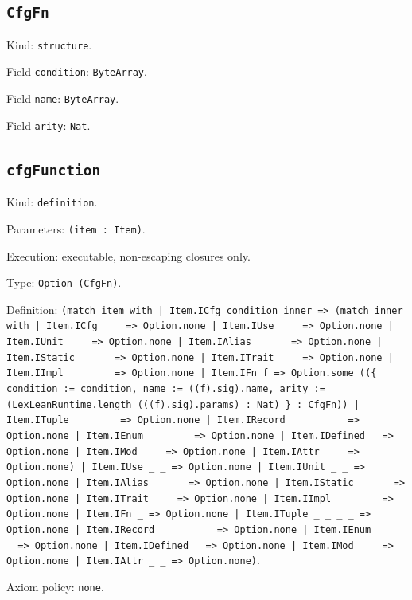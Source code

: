 \documentclass[11pt]{article}
\begin{document}
\subsection*{\texttt{CfgFn}}
\noindent Kind: \texttt{structure}.\par
\noindent Field \texttt{condition}: \texttt{ByteArray}.\par
\noindent Field \texttt{name}: \texttt{ByteArray}.\par
\noindent Field \texttt{arity}: \texttt{Nat}.\par
\subsection*{\texttt{cfgFunction}}
\noindent Kind: \texttt{definition}.\par
\noindent Parameters: \texttt{(item : Item)}.\par
\noindent Execution: executable, non-escaping closures only.\par
\noindent Type: \texttt{Option (CfgFn)}.\par
\noindent Definition: \texttt{(match item with | Item.ICfg condition inner => (match inner with | Item.ICfg \_ \_ => Option.none | Item.IUse \_ \_ => Option.none | Item.IUnit \_ \_ => Option.none | Item.IAlias \_ \_ \_ => Option.none | Item.IStatic \_ \_ \_ => Option.none | Item.ITrait \_ \_ => Option.none | Item.IImpl \_ \_ \_ \_ => Option.none | Item.IFn f => Option.some ((\{ condition := condition, name := ((f).sig).name, arity := (LexLeanRuntime.length (((f).sig).params) : Nat) \} : CfgFn)) | Item.ITuple \_ \_ \_ \_ => Option.none | Item.IRecord \_ \_ \_ \_ \_ => Option.none | Item.IEnum \_ \_ \_ \_ => Option.none | Item.IDefined \_ => Option.none | Item.IMod \_ \_ => Option.none | Item.IAttr \_ \_ => Option.none) | Item.IUse \_ \_ => Option.none | Item.IUnit \_ \_ => Option.none | Item.IAlias \_ \_ \_ => Option.none | Item.IStatic \_ \_ \_ => Option.none | Item.ITrait \_ \_ => Option.none | Item.IImpl \_ \_ \_ \_ => Option.none | Item.IFn \_ => Option.none | Item.ITuple \_ \_ \_ \_ => Option.none | Item.IRecord \_ \_ \_ \_ \_ => Option.none | Item.IEnum \_ \_ \_ \_ => Option.none | Item.IDefined \_ => Option.none | Item.IMod \_ \_ => Option.none | Item.IAttr \_ \_ => Option.none)}.\par
\noindent Axiom policy: \texttt{none}.\par
\end{document}
